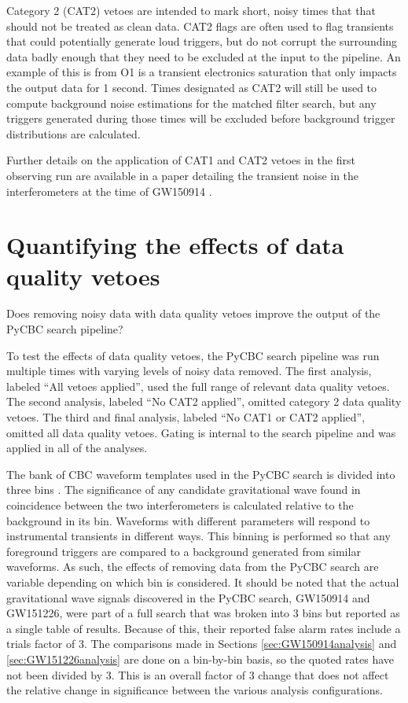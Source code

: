 Category 2 (CAT2) vetoes are intended to mark short, noisy times that
that should not be treated as clean data. CAT2 flags are often
used to flag transients that could potentially generate loud triggers, but do not
corrupt the surrounding data badly enough that they need to be excluded at the input to the pipeline.
An example of this is from O1 is a transient electronics saturation that only impacts the output
data for 1 second.  Times designated
as CAT2 will still be used to compute background noise estimations for the matched filter search,
but any triggers generated
during those times will be excluded before background trigger distributions are calculated.

Further details on the application of CAT1 and CAT2 vetoes in the first observing run
are available in a paper detailing the transient noise in the interferometers at the
time of GW150914 \cite{GW150914-DETCHAR}.

\section{Quantifying the effects of data quality vetoes}
Does removing noisy data with data quality vetoes improve the output of the PyCBC search pipeline?

To test the effects of data quality vetoes, the PyCBC search pipeline was run multiple times with
varying levels of noisy data removed. The first analysis, labeled
``All vetoes applied'', used the full range of relevant data quality vetoes. The second
analysis, labeled ``No CAT2 applied'', omitted category 2 data quality vetoes. The third and final
analysis, labeled ``No CAT1 or CAT2 applied'', omitted all data quality vetoes.
Gating is internal to the search pipeline and was applied in all of the analyses.

The bank of CBC waveform templates used in the PyCBC search is divided into three bins
\cite{GW150914-CBC}. The significance of any candidate gravitational wave found in
coincidence between the two interferometers is calculated relative to the background in its bin.
Waveforms with different parameters will respond to instrumental transients in different ways.
This binning is performed so that any foreground triggers are compared to a background
generated from similar waveforms.
As such, the effects of removing data from the PyCBC search are variable depending on
which bin is considered. It should be noted that the actual gravitational wave signals
discovered in the PyCBC search,
GW150914 and GW151226, were part of a full search that was broken into 3 bins but reported
as a single table of results. Because of this,
their reported false alarm rates include a trials factor of 3. The comparisons made in Sections
\ref{sec:GW150914analysis} and \ref{sec:GW151226analysis} are done on a bin-by-bin basis,
so the quoted rates have not been divided by 3. This is an overall factor of 3 change
that does not affect the relative change in significance between the various analysis
configurations.

